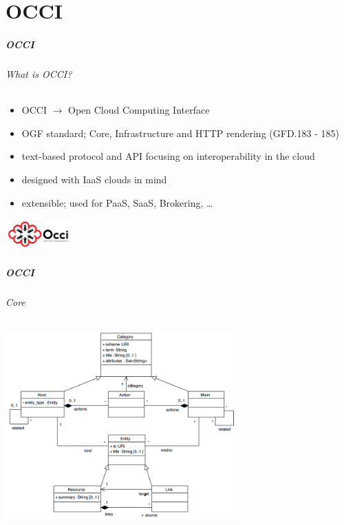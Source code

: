 \part{OCCI}

\begin{frame}
  \frametitle{OCCI}
  \framesubtitle{What is OCCI?}

  \begin{itemize}
    \item OCCI $\rightarrow$ Open Cloud Computing Interface
    \item OGF standard; Core, Infrastructure and HTTP rendering (GFD.183 - 185)
    \item text-based protocol and API focusing on interoperability in the cloud
    \item designed with IaaS clouds in mind
    \item extensible; used for PaaS, SaaS, Brokering, \dots
  \end{itemize}

  \vspace{0.5cm}
  \hfill \includegraphics[width=2.5cm]{images/OCCI_tagline}
\end{frame}

\begin{frame}
  \frametitle{OCCI}
  \framesubtitle{Core}

  \begin{center}
    \includegraphics[width=9cm]{images/occi_core_spec}
  \end{center}
\end{frame}

